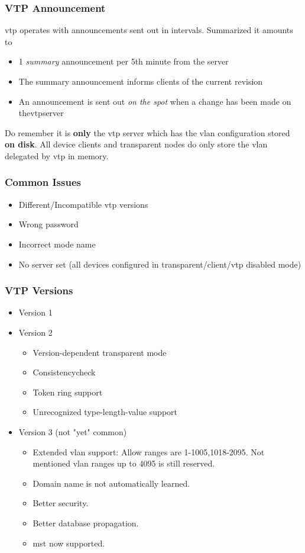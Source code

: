 \subsubsection{VTP Announcement}
\gls{vtp} operates with announcements sent out in intervals. Summarized it amounts to
\begin{itemize}
    \item 1 \textit{summary} announcement per 5th minute from the server
    \item The summary announcement informs clients of the current revision
    \item An announcement is sent out \textit{on the spot} when a change has been made on the\gls{vtp}server
\end{itemize}

Do remember it is \textbf{only} the \gls{vtp} server which has the \gls{vlan} configuration stored \textbf{on disk}. All device clients and transparent nodes do only store the \gls{vlan} delegated by \gls{vtp} in memory.

\subsubsection{Common Issues}
\begin{itemize}
    \item Different/Incompatible \gls{vtp} versions
    \item Wrong password
    \item Incorrect mode name
    \item No server set (all devices configured in transparent/client/\gls{vtp} disabled mode)
\end{itemize}

\subsubsection{VTP Versions}
\begin{itemize}
    \item Version 1
    \item Version 2
    \begin{itemize}
        \item Version-dependent	transparent	mode
        \item Consistencycheck
        \item Token ring support
        \item Unrecognized type-length-value support
    \end{itemize}
    \item Version 3 (not "yet" common)
    \begin{itemize}
        \item Extended \gls{vlan} support: Allow ranges are 1-1005,1018-2095. Not mentioned \gls{vlan} ranges up to 4095 is still reserved.
        \item Domain name is not automatically learned.
        \item Better security.
        \item Better database propagation.
        \item \gls{mst} now supported.
    \end{itemize}
\end{itemize}

